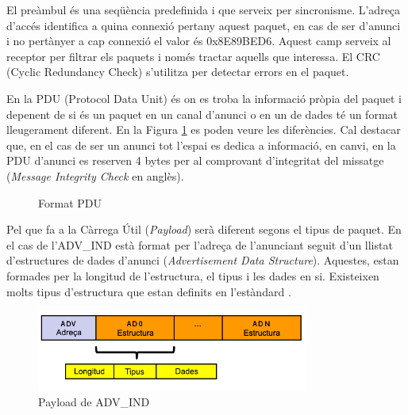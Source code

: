 El preàmbul és una seqüència predefinida i que serveix per sincronisme.
L'adreça d'accés identifica a quina connexió pertany aquest paquet, en cas de ser d'anunci i no pertànyer a cap connexió el valor és 0x8E89BED6.
Aquest camp serveix al receptor per filtrar els paquets i només tractar aquells que interessa.
El CRC (Cyclic Redundancy Check) s'utilitza per detectar errors en el paquet. 

En la PDU (Protocol Data Unit) és on es troba la informació pròpia del paquet i depenent de si és un paquet en un canal d'anunci o en un de dades té un format lleugerament diferent.
En la Figura \ref{fig:pdu_format} es poden veure les diferències.
Cal destacar que, en el cas de ser un anunci tot l'espai es dedica a informació, en canvi, en la PDU d'anunci es reserven 4 bytes per al comprovant d'integritat del missatge (\textit{Message Integrity Check} en anglès).

\begin{figure}[!h]
	\begin{center}
		\begin{subfigmatrix}{1}
		\end{subfigmatrix}
	\end{center}
	\caption{Format PDU}
	\label{fig:pdu_format}
\end{figure}

Pel que fa a la Càrrega Útil (\textit{Payload}) serà diferent segons el tipus de paquet.
En el cas de l'ADV\_IND està format per l'adreça de l'anunciant seguit d'un llistat d'estructures de dades d'anunci (\textit{Advertisement Data Structure}).
Aquestes, estan formades per la longitud de l'estructura, el tipus i les dades en si.
Existeixen molts tipus d'estructura que estan definits en l'estàndard \cite{AD_Types}.

\begin{figure}[!h]
	\begin{center}
		\includegraphics[width=0.8\textwidth]{./images/adv-ind-packet.png}
		\caption{Payload de ADV\_IND \cite{BLE_4.2_packet_format}}
	\end{center}
\end{figure}

